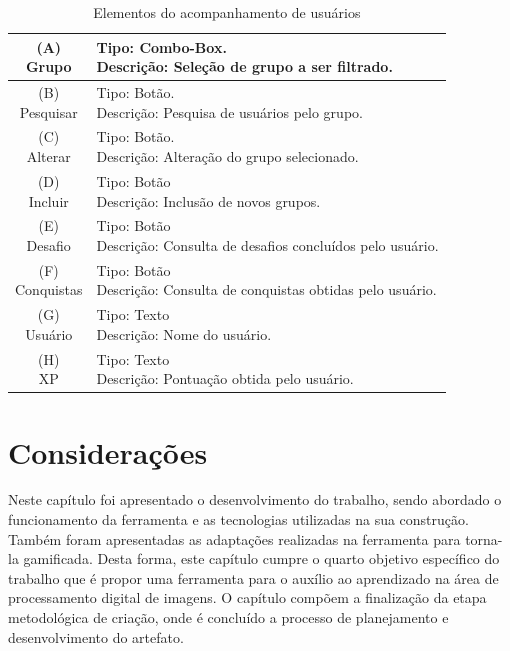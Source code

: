 \documentclass[
	12pt,				%
	oneside,			%
	a4paper,			%
	english,			%
	french,				%
	spanish,			%
	brazil,				%
	]{abntex2}
\begin{document}
\begin{longtable}{|c|l|}
 \caption{Elementos do acompanhamento de usuários} \label{tab:visnodeUsuarios} \\
  \hline
  \makecell{(A) \\ Grupo} 
  &
  \makecell[l]{Tipo: Combo-Box.\\ Descrição: Seleção de grupo a ser filtrado.} \\
  \hline
  \makecell{(B) \\ Pesquisar} 
  &
  \makecell[l]{Tipo: Botão.\\ Descrição: Pesquisa de usuários pelo grupo.} \\
  \hline
  \makecell{(C) \\ Alterar} 
  &
  \makecell[l]{Tipo: Botão. \\ Descrição: Alteração do grupo selecionado.} \\
  \hline
  \makecell{(D) \\ Incluir} 
  &
  \makecell[l]{Tipo: Botão\\ Descrição: Inclusão de novos grupos.} \\
  \hline
  \makecell{(E) \\ Desafio} 
  &
  \makecell[l]{Tipo: Botão\\ Descrição: Consulta de desafios concluídos pelo usuário.} \\
  \hline  
  \makecell{(F) \\ Conquistas} 
  &
  \makecell[l]{Tipo: Botão\\ Descrição: Consulta de conquistas obtidas pelo usuário.} \\
  \hline    
  \makecell{(G) \\ Usuário} 
  &
  \makecell[l]{Tipo: Texto\\ Descrição: Nome do usuário.} \\
  \hline    
  \makecell{(H) \\ XP} 
  &
  \makecell[l]{Tipo: Texto\\ Descrição: Pontuação obtida pelo usuário.} \\
  \hline       
\end{longtable}

\section{Considerações}

Neste capítulo foi apresentado o desenvolvimento do trabalho, sendo abordado o funcionamento da ferramenta e as tecnologias utilizadas na sua construção. Também foram apresentadas as adaptações realizadas na ferramenta para torna-la gamificada. Desta forma, este capítulo cumpre o quarto objetivo específico do trabalho que é propor uma ferramenta para o auxílio ao aprendizado na área de processamento digital de imagens. O capítulo compõem a finalização da etapa metodológica de criação, onde é concluído a processo de planejamento e desenvolvimento do artefato.
\end{document}
